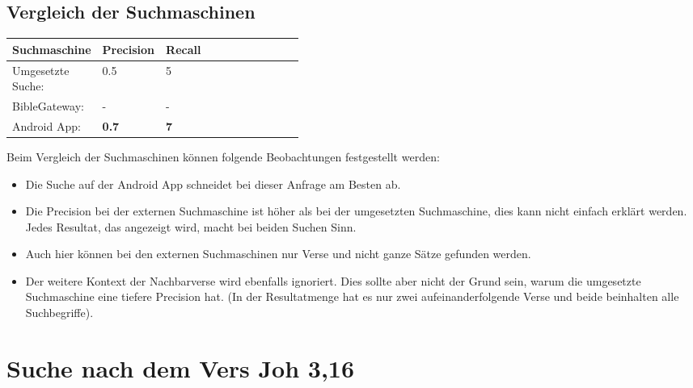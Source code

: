 \subsection{Vergleich der Suchmaschinen}
\begin{table}[H]
	\centering
	\small\renewcommand{\arraystretch}{1.4}
	\begin{tabularx}{0.9\textwidth}{ L{0.22\linewidth} | L{0.2\linewidth} | X }%
		\hline
		\textbf{Suchmaschine} & \textbf{Precision} & \textbf{Recall} \\ \hline \hline
		Umgesetzte Suche: & 0.5 & 5\\
		BibleGateway: & - & -\\
		Android App: & \textbf{0.7} & \textbf{7}\\
		\hline
	\end{tabularx}
\end{table}

Beim Vergleich der Suchmaschinen können folgende Beobachtungen festgestellt werden:
\begin{itemize}[noitemsep]
	\item Die Suche auf der Android App schneidet bei dieser Anfrage am Besten ab.
	
	\item Die Precision bei der externen Suchmaschine ist höher als bei der umgesetzten Suchmaschine, dies kann nicht einfach erklärt werden. Jedes Resultat, das angezeigt wird, macht bei beiden Suchen Sinn.
	
	\item Auch hier können bei den externen Suchmaschinen nur Verse und nicht ganze Sätze gefunden werden.
	
	\item Der weitere Kontext der Nachbarverse wird ebenfalls ignoriert.
	Dies sollte aber nicht der Grund sein, warum die umgesetzte Suchmaschine eine tiefere Precision hat. (In der Resultatmenge hat es nur zwei aufeinanderfolgende Verse und beide beinhalten alle Suchbegriffe).
\end{itemize}



\newpage
\section{Suche nach dem Vers Joh 3,16}

